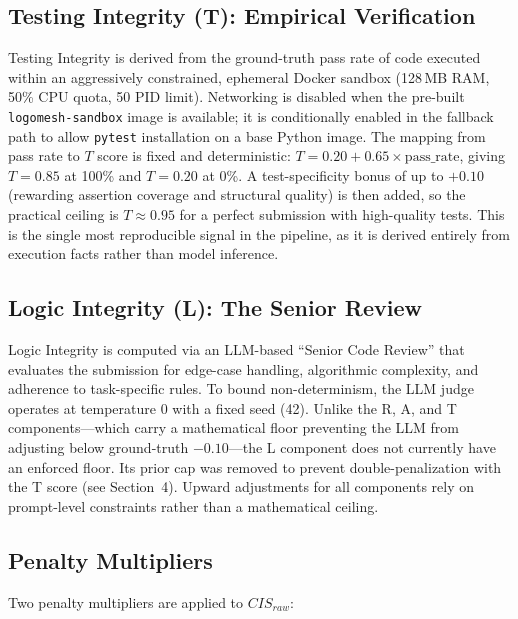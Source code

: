 \documentclass[11pt, a4paper]{article}
\begin{document}
\subsection{Testing Integrity (T): Empirical Verification}

Testing Integrity is derived from the ground-truth pass rate of code executed within an aggressively constrained, ephemeral Docker sandbox (128\,MB RAM, 50\% CPU quota, 50 PID limit). Networking is disabled when the pre-built \texttt{logomesh-sandbox} image is available; it is conditionally enabled in the fallback path to allow \texttt{pytest} installation on a base Python image. The mapping from pass rate to $T$ score is fixed and deterministic: $T = 0.20 + 0.65 \times \text{pass\_rate}$, giving $T = 0.85$ at 100\% and $T = 0.20$ at 0\%. A test-specificity bonus of up to $+0.10$ (rewarding assertion coverage and structural quality) is then added, so the practical ceiling is $T \approx 0.95$ for a perfect submission with high-quality tests. This is the single most reproducible signal in the pipeline, as it is derived entirely from execution facts rather than model inference.

\subsection{Logic Integrity (L): The Senior Review}

Logic Integrity is computed via an LLM-based ``Senior Code Review'' that evaluates the submission for edge-case handling, algorithmic complexity, and adherence to task-specific rules. To bound non-determinism, the LLM judge operates at temperature 0 with a fixed seed (42). Unlike the R, A, and T components—which carry a mathematical floor preventing the LLM from adjusting below ground-truth $-0.10$—the L component does not currently have an enforced floor. Its prior cap was removed to prevent double-penalization with the T score (see Section~4). Upward adjustments for all components rely on prompt-level constraints rather than a mathematical ceiling.

\subsection{Penalty Multipliers}

Two penalty multipliers are applied to $CIS_{raw}$:
\end{document}
